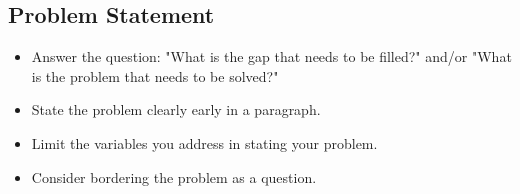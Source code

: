 %
%


\subsection{Problem Statement}\label{subsec:problem-statement}

\begin{itemize}
    \item Answer the question: "What is the gap that needs to be filled?"
    and/or "What is the problem that needs to be solved?"
    \item State the problem clearly early in a paragraph.
    \item Limit the variables you address in stating your problem.
    \item Consider bordering the problem as a question.
\end{itemize}

